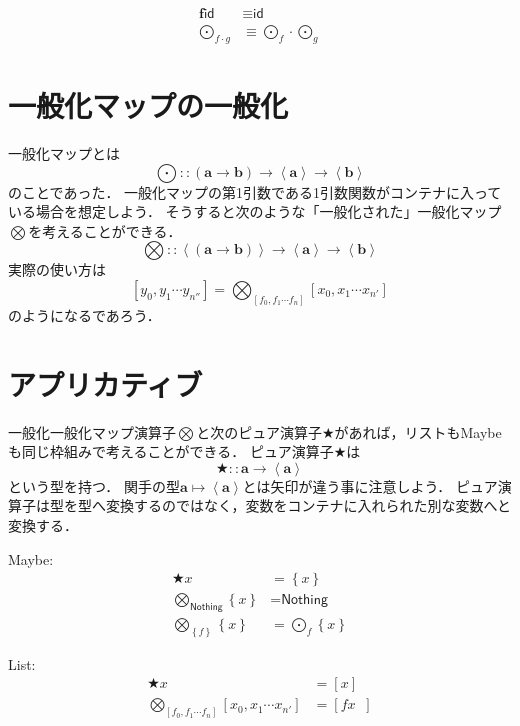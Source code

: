 \documentclass[twocolumn]{jsbook}
\newcommand{\applicativefunc}{\bigotimes}
\newcommand{\guard}[1]{\mathop{\mid_{{#1}}}}
\newcommand{\mapfunc}{\bigodot}
\newcommand{\pure}{\bigstar}
\newcommand{\typename}[1]{\bm{#1}}
\newcommand{\generalcontainer}[1]{\left\langle#1\right\rangle}
\newcommand{\listtype}[1]{\left[#1\right]}
\newcommand{\maybe}[1]{\left\{#1\right\}}
\newcommand{\functor}[1]{\mathop{\textbf{#1}}}
\newcommand{\specialkeyword}[1]{\textsf{#1}}
\newcommand{\identity}{\specialkeyword{id}}
\newcommand{\nothing}{\specialkeyword{Nothing}}
\begin{document}
\begin{align}
\functor{f}\identity&\equiv\identity\\
\mapfunc_{f\cdot g}&\equiv\mapfunc_f\cdot\mapfunc_g
\end{align}


\section{一般化マップの一般化}

一般化マップとは$$\mapfunc::(\typename{a}\rightarrow\typename{b})\rightarrow\generalcontainer{\typename{a}}\rightarrow\generalcontainer{\typename{b}}$$のことであった．
一般化マップの第1引数である1引数関数がコンテナに入っている場合を想定しよう．
そうすると次のような「一般化された」一般化マップ$\applicativefunc$を考えることができる．
$$\applicativefunc::\generalcontainer{(\typename{a}\rightarrow\typename{b})}\rightarrow\generalcontainer{\typename{a}}\rightarrow\generalcontainer{\typename{b}}$$
実際の使い方は$$\listtype{y_0,y_1\dotsb y_{n''}}=\applicativefunc_{\listtype{f_0,f_1\dotsb f_n}}\listtype{x_0,x_1\dotsb x_{n'}}$$のようになるであろう．

\section{アプリカティブ}

一般化一般化マップ演算子$\applicativefunc$と次のピュア演算子$\pure$があれば，リストもMaybeも同じ枠組みで考えることができる．
ピュア演算子$\pure$は$$\pure::\typename{a}\rightarrow\generalcontainer{\typename{a}}$$という型を持つ．
関手の型$\typename{a}\mapsto\generalcontainer{\typename{a}}$とは矢印が違う事に注意しよう．
ピュア演算子は型を型へ変換するのではなく，変数をコンテナに入れられた別な変数へと変換する．

Maybe:
\begin{align*}
\pure x&=\maybe{x}\\
\applicativefunc_{\nothing}\maybe{x}&=\nothing\\
\applicativefunc_{\maybe{f}}\maybe{x}&=\mapfunc_f\maybe{x}
\end{align*}

List:
\begin{align*}
\pure x&=\listtype{x}\\
\applicativefunc_{\listtype{f_0,f_1\dotsb f_n}}\listtype{x_0,x_1\dotsb x_{n'}}&=\listtype{fx\guard{f\in\listtype{f_0,f_1\dotsb f_n},x\in\listtype{x_0,x_1\dotsb x_{n'}}}}
\end{align*}
\end{document}
